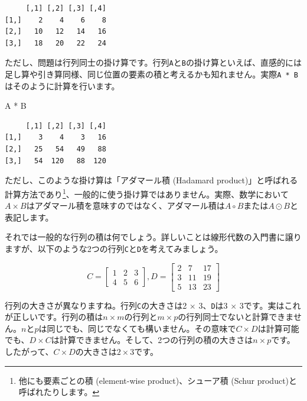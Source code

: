 \documentclass[
  a4paper,
  pandoc,
  ja=standard,
  jafont=haranoaji]{bxjsbook}
\newenvironment{Shaded}{\begin{snugshade}}{\end{snugshade}}
\newcommand{\NormalTok}[1]{\textcolor[rgb]{0.00,0.48,0.65}{#1}}
\newcommand{\SpecialCharTok}[1]{\textcolor[rgb]{0.37,0.37,0.37}{#1}}
\begin{document}
\begin{verbatim}
     [,1] [,2] [,3] [,4]
[1,]    2    4    6    8
[2,]   10   12   14   16
[3,]   18   20   22   24
\end{verbatim}

ただし、問題は行列同士の掛け算です。行列\texttt{A}と\texttt{B}の掛け算といえば、直感的には足し算や引き算同様、同じ位置の要素の積と考えるかも知れません。実際\texttt{A\ *\ B}はそのように計算を行います。

\begin{Shaded}
\begin{Highlighting}[numbers=left,,]
\NormalTok{A }\SpecialCharTok{*}\NormalTok{ B}
\end{Highlighting}
\end{Shaded}

\begin{verbatim}
     [,1] [,2] [,3] [,4]
[1,]    3    4    3   16
[2,]   25   54   49   88
[3,]   54  120   88  120
\end{verbatim}

ただし、このような掛け算は「アダマール積 (Hadamard
product)」と呼ばれる計算方法であり\footnote{他にも要素ごとの積
  (element-wise product)、シューア積 (Schur product)と呼ばれたりします。}、一般的に使う掛け算ではありません。実際、数学において\(A \times B\)はアダマール積を意味すのではなく、アダマール積は\(A \circ B\)または\(A \odot B\)と表記します。

それでは一般的な行列の積は何でしょう。詳しいことは線形代数の入門書に譲りますが、以下のような2つの行列\texttt{C}と\texttt{D}を考えてみましょう。

\[
C = \left[
\begin{matrix} 
1 & 2 & 3 \\ 
4 & 5 & 6 
\end{matrix}
\right],
D = \left[
\begin{matrix} 
2 & 7  & 17 \\ 
3 & 11 & 19 \\
5 & 13 & 23
\end{matrix}
\right]
\]

行列の大きさが異なりますね。行列\texttt{C}の大きさは2 \(\times\)
3、\texttt{D}は3 \(\times\)
3です。実はこれが正しいです。行列の積は\(n \times m\)の行列と\(m \times p\)の行列同士でないと計算できません。\(n\)と\(p\)は同じでも、同じでなくても構いません。その意味で\(C \times D\)は計算可能でも、\(D \times C\)は計算できません。そして、2つの行列の積の大きさは\(n \times p\)です。したがって、\(C \times D\)の大きさは\(2 \times 3\)です。
\end{document}

